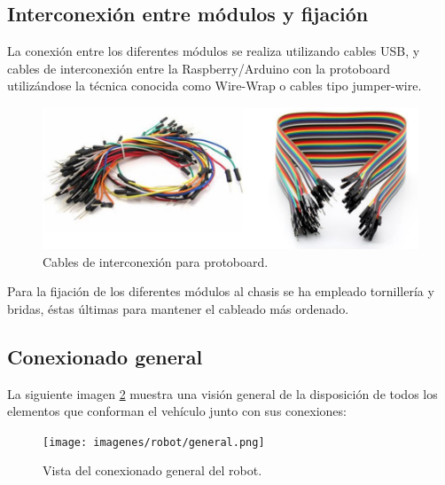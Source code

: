 \subsection{Interconexión entre módulos y fijación}

La conexión entre los diferentes módulos se realiza utilizando cables USB, y cables de interconexión entre la Raspberry/Arduino con la protoboard utilizándose la técnica
conocida como Wire-Wrap o cables tipo jumper-wire.\\

\begin{figure}[H]
  \begin{center}
    \includegraphics[scale=0.3]{imagenes/cables_interconexion.png}
  \end{center}
  \caption{Cables de interconexión para protoboard.}
  \label{figura:cables_interconexion}
\end{figure}

Para la fijación de los diferentes módulos al chasis se ha empleado tornillería y bridas, éstas últimas para mantener el cableado más ordenado.\\

\subsection{Conexionado general}

La siguiente imagen \ref{vista-conexiones} muestra una visión general de la disposición de todos los elementos que conforman el vehículo junto con sus conexiones:\\


\begin{figure}[H]
  \begin{center}
   \texttt{[image: imagenes/robot/general.png]}
  \end{center}
  \caption{Vista del conexionado general del robot.}
  \label{vista-conexiones}
\end{figure}



